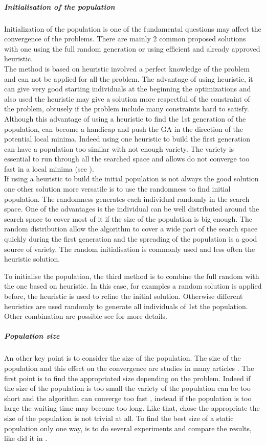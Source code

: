 \subparagraph{Initialisation of the population}\label{sec:initPOP}
Initialization of the population is one of the fundamental questions may affect the convergence of the problems. There are mainly 2 common proposed solutions with one using the full random generation or  using efficient and already approved heuristic.\\
 The method is based on heuristic involved a perfect knowledge  of the problem and can not be applied  for all the problem. The advantage of using heuristic, it can give very good starting individuals at the beginning the optimizations and also used the heuristic may give a solution more respectful of the constraint of the problem, obtusely if the problem include many constraints hard to satisfy. \\
Although this advantage of using a heuristic to find the 1st generation of the population, can become a handicap and push the GA in the direction of the potential local minima. Indeed using one heuristic to build the first generation can have a population too similar with not enough variety. The variety is essential to run through all the searched space and allows do not converge too fast in a local minima (see \citep{64*matsui1999}).\\
If using a heuristic to build the initial population is not always the good solution one other solution more versatile is to use the randomness to find initial population. The  randomness generates each individual randomly in the search space. One of the advantages is the individual can be well distributed around the search space to cover most of it  if the size of the population is big enough. 
The random  distribution allow the algorithm  to cover a wide part of the search space quickly during the first generation and the spreading of the population is a good source of variety.
The random initialisation is commonly used and less often the heuristic solution.

To initialise the population, the third method is to combine the full random with the one based on heuristic. 
In this case, for examples a random solution is applied before, the heuristic is used to refine the initial solution. Otherwise different heuristics are used randomly to generate all individuals of  1st the population. Other combination are possible  see \cite{113*mais2010} for more details.

\subparagraph{Population size}
An other key point is to consider the size  of the population. The size of the population and this effect on the convergence are studies in many articles \cite{64*matsui1999,70*arabas1994,71*grefenstette1986,77*shi2005,97*goldberg1985,109*cerf1995}. 
The first point is to find the appropriated size depending on the problem. Indeed if the size of the population is too small the variety of the population can be too short and the algorithm can converge too fast \cite{70*arabas1994}, instead if the population is too large the waiting time may become too long.  
Like that, chose the appropriate the size of the population is not trivial at all. To find the best size of a static population only one way, is to do several experiments and compare the results, like did it in \cite{71*grefenstette1986}.

